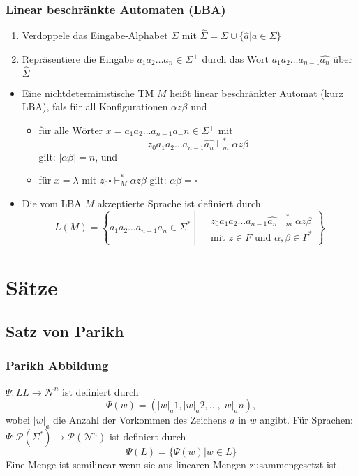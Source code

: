 \documentclass[9pt, a4paper]{article}
\begin{document}
\subsubsection{Linear beschränkte Automaten (LBA)}
\begin{enumerate}
	\item Verdoppele das Eingabe-Alphabet $\Sigma$ mit $\hat{\Sigma} = \Sigma \cup \{\hat{a}|a \in \Sigma\}$
	\item Repräsentiere die Eingabe $a_1a_2 \dots a_n \in \Sigma^+$ durch das Wort $a_1a_2 \dots a_{n-1}\hat{a_n}$ über $\hat{\Sigma}$
		
\end{enumerate}
\begin{itemize}
	\item Eine nichtdeterministische TM $M$ heißt linear beschränkter Automat (kurz LBA), fals für all Konfigurationen $\alpha z \beta$ und
	\begin{itemize}
		\item für alle Wörter $x = a_1a_2 \dots a_{n-1}a_-n \in \Sigma^+$ mit
		$$z_0a_1a_2 \dots a_{n-1}\hat{a_n}\vdash^*_m \alpha z \beta$$
		gilt: $|\alpha \beta| = n$, und
		\item für $x = \lambda$ mit $z_0 \square \vdash^*_M \alpha z \beta$ gilt: $\alpha\beta = \square$
	\end{itemize}
	\item Die vom LBA $M$ akzeptierte Sprache ist definiert durch
	$$L(M) = \left\{
					a_1a_2 \dots a_{n-1}a_n \in \Sigma^* \middle|
					\begin{split}
					&z_0a_1a_2 \dots a_{n-1} \hat{a_n} \vdash^*_m \alpha z\beta\\
					&\text{mit } z \in F \text{ und } \alpha, \beta \in \Gamma^*
					\end{split}
		   	\right\}$$
\end{itemize}



\section{Sätze}

\subsection{Satz von Parikh}

\subsubsection{Parikh Abbildung}
$\Psi: LL \to \mathcal{N}^n$ ist definiert durch
$$\Psi(w) = (|w|_a1, |w|_a2, \dots, |w|_an),$$
wobei $|w|_a$ die Anzahl der Vorkommen des Zeichens $a$ in $w$ angibt. Für Sprachen:
$\Psi: \mathcal{P}(\Sigma^*) \to \mathcal{P}(\mathcal{N}^n)$ ist definiert durch
$$\Psi(L) = \{\Psi(w)|w \in L\}$$
Eine Menge ist semilinear wenn sie aus linearen Mengen zusammengesetzt ist.
\end{document}
